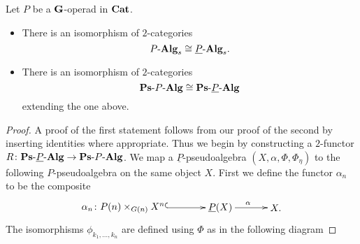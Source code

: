\begin{thm}
Let $P$ be a $\mathbf{G}$-operad in $\mathbf{Cat}$.
\begin{itemize}
\item There is an isomorphism of $2$-categories
    \[
        P\mbox{-}\mathbf{Alg}_{s} \cong \underline{P}\mbox{-}\mathbf{Alg}_{s}.
    \]
\item There is an isomorphism of $2$-categories
    \[
        \mathbf{Ps}\mbox{-}P\mbox{-}\mathbf{Alg} \cong \mathbf{Ps}\mbox{-}\underline{P}\mbox{-}\mathbf{Alg}
    \]
    extending the one above.
\end{itemize}
\end{thm}
\begin{proof}
A proof of the first statement follows from our proof of the second by inserting identities where appropriate.  Thus we begin by constructing a $2$-functor $R \colon \mathbf{Ps}\mbox{-}\underline{P}\mbox{-}\mathbf{Alg} \rightarrow \mathbf{Ps}\mbox{-}P\mbox{-}\mathbf{Alg}$. We map a $\underline{P}$-pseudoalgebra $(X,\alpha,\Phi,\Phi_\eta)$ to the following $P$-pseudoalgebra on the same object $X$. First we define the functor $\alpha_n$ to be the composite
    \[
        \xy
            (0,0)*+{\alpha_n \colon P(n) \times_{G(n)} X^n}="00";
            (35,0)*+{\underline{P}(X)}="10";
            (55,0)*+{X.}="20";
            {\ar@{^{(}->} "00" ; "10"};
            {\ar^{\alpha} "10" ; "20"};
        \endxy
    \]
The isomorphisms $\phi_{k_1,\ldots,k_n}$ are defined using $\Phi$ as in the following diagram

\end{proof}
